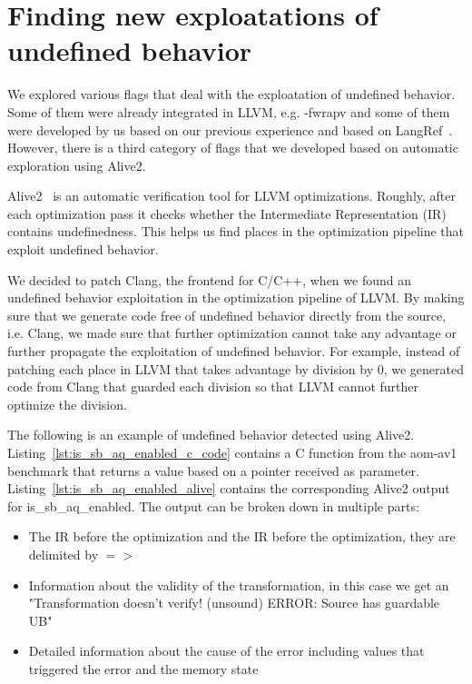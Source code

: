 \section{Finding new exploatations of undefined behavior}

We explored various flags that deal with the exploatation of undefined behavior.
Some of them were already integrated in LLVM, e.g. -fwrapv and some of them were
developed by us based on our previous experience and based on
LangRef~\cite{langref}. However, there is a third category of flags that we
developed based on automatic exploration using Alive2.

Alive2~\cite{lopes2021alive2} is an automatic verification tool for LLVM
optimizations. Roughly, after each optimization pass it checks whether the
Intermediate Representation (IR) contains undefinedness. This helps us find
places in the optimization pipeline that exploit undefined behavior.

We decided to patch Clang, the frontend for C/C++, when we found an undefined
behavior exploitation in the optimization pipeline of LLVM. By making sure that
we generate code free of undefined behavior directly from the source, i.e.
Clang, we made sure that further optimization cannot take any advantage or
further propagate the exploitation of undefined behavior. For example, instead
of patching each place in LLVM that takes advantage by division by 0, we
generated code from Clang that guarded each division so that LLVM cannot further
optimize the division.


The following is an example of undefined behavior detected using Alive2.
Listing~\ref{lst:is_sb_aq_enabled_c_code} contains a C function from the
aom-av1~\cite{aomav1benchmark} benchmark that returns a value based on a pointer
received as parameter. Listing~\ref{lst:is_sb_aq_enabled_alive} contains the
corresponding Alive2 output for is_sb_aq_enabled. The output can be broken down
in multiple parts:

\begin{itemize}
  \item The IR before the optimization and the IR before the optimization, they
are delimited by \(=>\)
  \item Information about the validity of the transformation, in this case we
get an "Transformation doesn't verify! (unsound) ERROR: Source has guardable UB"
  \item Detailed information about the cause of the error including values that
triggered the error and the memory state
\end{itemize}

